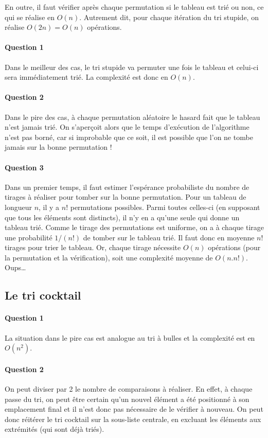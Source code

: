 \documentclass{article}%
\begin{document}
En outre, il faut vérifier après chaque permutation si le tableau est trié ou non, ce qui se réalise en $O(n)$. Autrement dit, pour chaque itération du tri stupide, on réalise $O(2n) = O(n)$ opérations.

\paragraph{Question 1} Dans le meilleur des cas, le tri stupide va permuter une fois le tableau et celui-ci sera immédiatement trié. La complexité est donc en $O(n)$.

\paragraph{Question 2} Dans le pire des cas, à chaque permutation aléatoire le hasard fait que le tableau n'est jamais trié. On s'aperçoit alors que le temps d'exécution de l'algorithme n'est pas borné, car si improbable que ce soit, il est possible que l'on ne tombe jamais sur la bonne permutation !

\paragraph{Question 3} Dans un premier temps, il faut estimer l'espérance probabiliste du nombre de tirages à réaliser pour tomber sur la bonne permutation. Pour un tableau de longueur $n$, il y a $n!$ permutations possibles. Parmi toutes celles-ci (en supposant que tous les éléments sont distincts), il n'y en a qu'une seule qui donne un tableau trié. Comme le tirage des permutations est uniforme, on a à chaque tirage une probabilité $1/(n!)$ de tomber sur le tableau trié. Il faut donc en moyenne $n!$ tirages pour trier le tableau. Or, chaque tirage nécessite $O(n)$ opérations (pour la permutation et la vérification), soit une complexité moyenne de $O(n . n!)$. Oups\dots

\subsection{Le tri cocktail}

\paragraph{Question 1} La situation dans le pire cas est analogue au tri à bulles et la complexité est en $O(n^2)$.

\paragraph{Question 2} On peut diviser par 2 le nombre de comparaisons à réaliser. En effet, à chaque passe du tri, on peut être certain qu'un nouvel élément a été positionné à son emplacement final et il n'est donc pas nécessaire de le vérifier à nouveau. On peut donc réitérer le tri cocktail sur la sous-liste centrale, en excluant les éléments aux extrémités (qui sont déjà triés).
\end{document}

